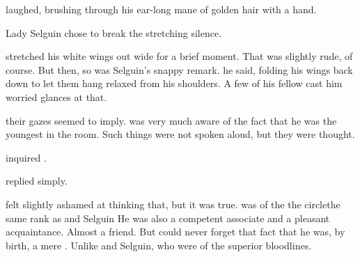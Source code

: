 \begin{garbage}


\Ganethed{} laughed, brushing through his ear-long mane of golden hair with a hand. 


%
Lady Selguin chose to break the stretching silence. 

\index{\ghobal}%
\Teshrial{} stretched his white wings out wide for a brief moment. 
That was slightly rude, of course. 
But then, so was Selguin's snappy remark. 
 he said, folding his wings back down to let them hang relaxed from his shoulders. 
A few of his fellow \resphain{} cast him worried glances at that.


 their gazes seemed to imply. 
\Teshrial{} was very much aware of the fact that he was the youngest \resphan{} in the room. 
Such things were not spoken aloud, but they were thought. 

%
 inquired \Ganethed. 

 \Teshrial{} replied simply. 


\index{\ketheran}
\index{\thelyad}
\Teshrial{} felt slightly ashamed at thinking that, but it was true. 
\Ganethed{} was of the the \teshrialcircle{} circle\dash the same rank as \Teshrial{} and Selguin
He was also a competent associate and a pleasant acquaintance. 
Almost a friend. 
But \Teshrial{} could never forget that fact that he was, by birth, a mere . 
Unlike \Teshrial{} and Selguin, who were of the superior  bloodlines. 


\end{garbage}
